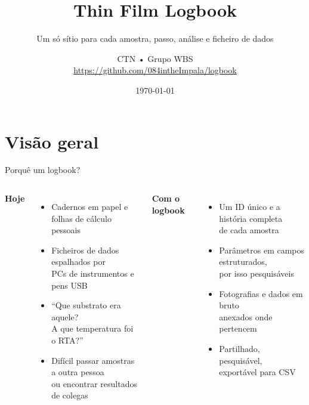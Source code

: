 \documentclass[aspectratio=169,11pt]{beamer}
\title{Thin Film Logbook}
\subtitle{Um só sítio para cada amostra, passo, análise e ficheiro de dados}
\date{\today}
\author[Grupo WBS (CTN)]{CTN • Grupo WBS\\[0.15cm]\footnotesize\url{https://github.com/084intheImpala/logbook}}
\begin{document}
{
\begin{frame}[plain]
  \titlepage
\end{frame}}

\section{Visão geral}
\begin{frame}{Porquê um logbook?}
  \small
  \begin{columns}[T]
    \textbf{Hoje}
    \begin{itemize}
      \item Cadernos em papel e\\ folhas de cálculo pessoais
      \item Ficheiros de dados espalhados por\\ PCs de instrumentos e pens USB
      \item ``Que substrato era aquele?\\ A que temperatura foi o RTA?''
      \item Difícil passar amostras a outra pessoa\\ ou encontrar resultados de colegas
    \end{itemize}
    \textbf{Com o logbook}
    \begin{itemize}
      \item Um ID único e a história completa\\ de cada amostra
      \item Parâmetros em campos estruturados,\\ por isso pesquisáveis
      \item Fotografias e dados em bruto\\ anexados onde pertencem
      \item Partilhado, pesquisável,\\ exportável para CSV
    \end{itemize}
  \end{columns}
\end{frame}
\end{document}
